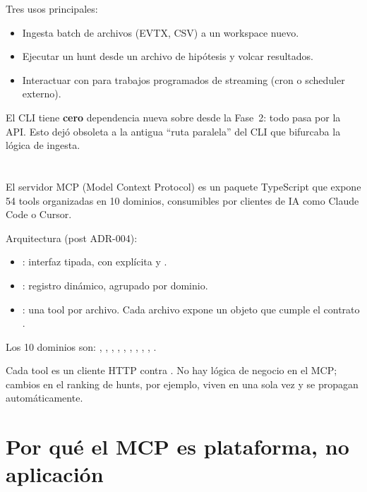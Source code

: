 Tres usos principales:

\begin{itemize}
    \item Ingesta batch de archivos (EVTX, CSV) a un workspace
    nuevo.
    \item Ejecutar un hunt desde un archivo de hipótesis y volcar
    resultados.
    \item Interactuar con  para trabajos
    programados de streaming (cron o scheduler externo).
\end{itemize}

El CLI tiene \textbf{cero} dependencia nueva sobre
 desde la Fase~2: todo pasa por la API. Esto dejó
obsoleta a la antigua ``ruta paralela'' del CLI que bifurcaba la
lógica de ingesta.

\section{}

El servidor MCP (Model Context Protocol) es un paquete TypeScript
que expone 54 tools organizadas en 10 dominios, consumibles por
clientes de IA como Claude Code o Cursor.

Arquitectura (post ADR-004):

\begin{itemize}
    \item {}: interfaz 
    tipada, con  explícita y .
    \item {}: registro dinámico,
    agrupado por dominio.
    \item {}: una tool por
    archivo. Cada archivo expone un objeto que cumple el contrato
    .
\end{itemize}

Los 10 dominios son: , , ,
, , , ,
, , .

Cada tool es un cliente HTTP contra . No
hay lógica de negocio en el MCP; cambios en el ranking de hunts,
por ejemplo, viven en  una sola vez y se
propagan automáticamente.

\section{Por qué el MCP es plataforma, no aplicación}

